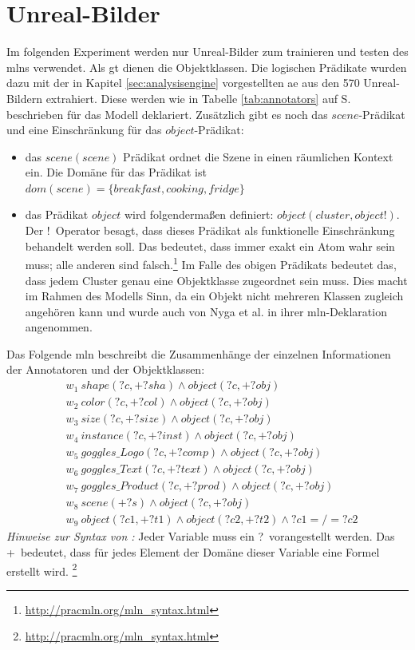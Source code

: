\section{Unreal-Bilder}
\label{sec:onlyUnrealImages}
Im folgenden Experiment werden nur Unreal-Bilder zum trainieren und testen des \gls{mlns} verwendet. Als \gls{gt} dienen die Objektklassen. Die logischen Prädikate wurden dazu mit der in Kapitel \ref{sec:analysisengine} vorgestellten \gls{ae} aus den 570 Unreal-Bildern extrahiert. Diese werden wie in Tabelle \ref{tab:annotators} auf S.\pageref{tab:annotators} beschrieben für das Modell deklariert.  Zusätzlich gibt es noch das $scene$-Prädikat und eine Einschränkung für das $object$-Prädikat:
\begin{itemize}
\item das $scene(scene)$ Prädikat ordnet die Szene in einen räumlichen Kontext ein. Die Domäne für das Prädikat ist $dom(scene) = \{breakfast, cooking, fridge\}$
\item das Prädikat $object$ wird folgendermaßen definiert: $object(cluster, object!)$. Der \glqq!\grqq \ Operator besagt, dass dieses Prädikat als funktionelle Einschränkung behandelt werden soll. Das bedeutet, dass immer exakt ein Atom wahr sein muss; alle anderen sind falsch.\footnote{\url{http://pracmln.org/mln_syntax.html}} Im Falle des obigen Prädikats bedeutet das, dass jedem Cluster genau eine Objektklasse zugeordnet sein muss. Dies macht im Rahmen des Modells Sinn, da ein Objekt nicht mehreren Klassen zugleich angehören kann und wurde auch von Nyga et al.\cite{pr2looking} in ihrer \gls{mln}-Deklaration angenommen.
\end{itemize}
Das Folgende \gls{mln} beschreibt die Zusammenhänge der einzelnen Informationen der Annotatoren und der Objektklassen:
\begin{align*}
& w_{1} \ shape(?c, +?sha) \wedge object(?c, +?obj) \\
& w_{2} \ color(?c, +?col) \wedge object(?c, +?obj) \\
& w_{3} \ size(?c, +?size) \wedge object(?c, +?obj) \\
& w_{4} \ instance(?c, +?inst) \wedge object(?c, +?obj) \\
& w_{5} \ goggles\_Logo(?c, +?comp) \wedge object(?c, +?obj)\\
& w_{6} \ goggles\_Text(?c, +?text) \wedge object(?c, +?obj)\\
& w_{7} \ goggles\_Product(?c, +?prod) \wedge object(?c, +?obj)\\
& w_{8} \ scene(+?s) \wedge object(?c, +?obj)\\
& w_{9} \ object(?c1, +?t1) \wedge object(?c2, +?t2) \wedge ?c1 =/= ?c2
\end{align*}
\textit{Hinweise zur Syntax von \pracmln:} Jeder Variable muss ein \glqq ?\grqq \ vorangestellt werden. Das \glqq +\grqq \ bedeutet, dass für jedes Element der Domäne dieser Variable eine Formel erstellt wird. \footnote{\url{http://pracmln.org/mln_syntax.html}}  \par
 
